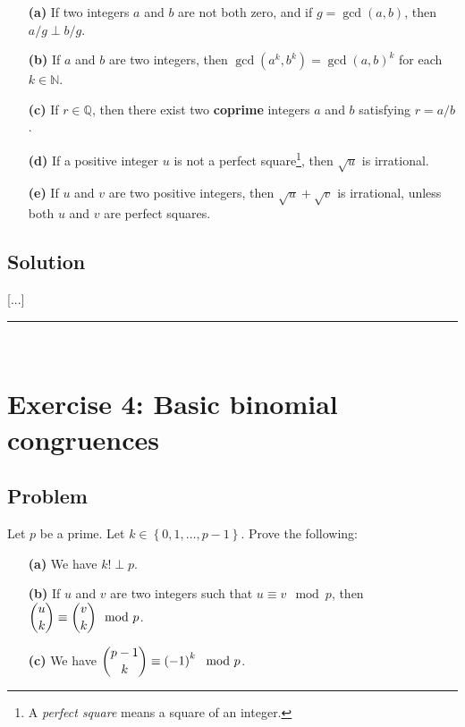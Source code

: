 \documentclass[paper=a4, fontsize=12pt]{scrartcl} %
\newcommand{\QQ}{\mathbb{Q}} %
\newcommand{\NN}{\mathbb{N}} %
\newcommand{\set}[1]{\left\{ #1 \right\}}
\newcommand{\tup}[1]{\left( #1 \right)}
\newcommand{\horrule}[1]{\rule{\linewidth}{#1}} %
\theoremstyle{plainsl}
\theoremstyle{definition}
\theoremstyle{remark}
\begin{document}
\begin{enumerate}

\item[\textbf{(a)}]
If two integers $a$ and $b$ are not both zero, and
if $g = \gcd\tup{a, b}$, then $a/g \perp b/g$.

\item[\textbf{(b)}]
If $a$ and $b$ are two integers, then
$\gcd\tup{a^k, b^k} = \gcd\tup{a, b}^k$ for each
$k \in \NN$.

\item[\textbf{(c)}]
If $r \in \QQ$, then there exist two \textbf{coprime}
integers $a$ and $b$ satisfying $r = a/b$.

\item[\textbf{(d)}]
If a positive integer $u$ is not a perfect
square\footnote{A \textit{perfect square} means a square
of an integer.},
then $\sqrt{u}$ is irrational.

\item[\textbf{(e)}]
If $u$ and $v$ are two positive integers,
then $\sqrt{u} + \sqrt{v}$ is irrational,
unless both $u$ and $v$ are perfect squares.

\end{enumerate}

\subsection{Solution}

[...]

\horrule{0.3pt} \\[0.4cm]

\section{Exercise 4: Basic binomial congruences}

\subsection{Problem}

Let $p$ be a prime.
Let $k \in \set{0, 1, \ldots, p-1}$.
Prove the following:

\begin{enumerate}

\item[\textbf{(a)}]
We have $k! \perp p$.

\item[\textbf{(b)}]
If $u$ and $v$ are two integers such that $u \equiv v \mod p$,
then
$\dbinom{u}{k} \equiv \dbinom{v}{k} \mod p$.

\item[\textbf{(c)}]
We have $\dbinom{p-1}{k} \equiv \tup{-1}^k \mod p$.

\end{enumerate}
\end{document}
